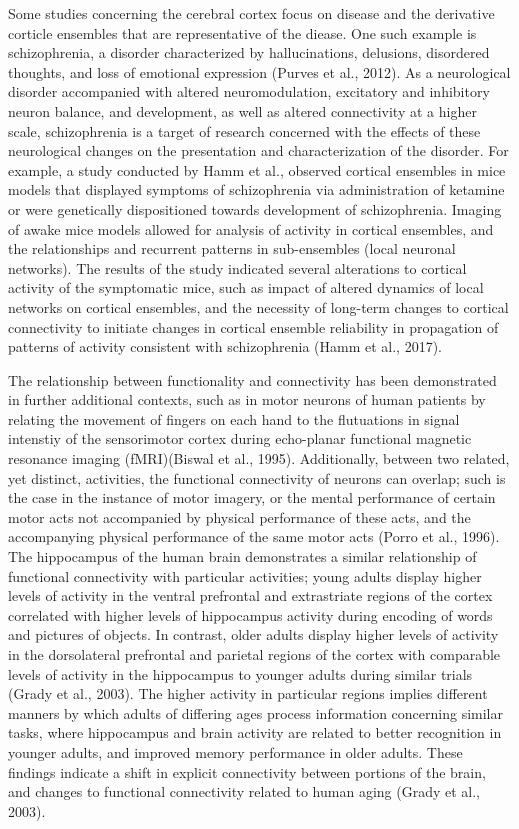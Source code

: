 \documentclass[11pt]{article}
\begin{document}
Some studies concerning the cerebral cortex focus on disease and the derivative corticle ensembles that are representative of the diease. One such example is schizophrenia, a disorder characterized by hallucinations, delusions, disordered thoughts, and loss of emotional expression (Purves et al., 2012). As a neurological disorder accompanied with altered neuromodulation, excitatory and inhibitory neuron balance, and development, as well as altered connectivity at a higher scale, schizophrenia is a target of research concerned with the effects of these neurological changes on the presentation and characterization of the disorder. For example, a study conducted by Hamm et al., observed cortical ensembles in mice models that displayed symptoms of schizophrenia via administration of ketamine or were genetically dispositioned towards development of schizophrenia. Imaging of awake mice models allowed for analysis of activity in cortical ensembles, and the relationships and recurrent patterns in sub-ensembles (local neuronal networks). The results of the study indicated several alterations to cortical activity of the symptomatic mice, such as impact of altered dynamics of local networks on cortical ensembles, and the necessity of long-term changes to cortical connectivity to initiate changes in cortical ensemble reliability in propagation of patterns of activity consistent with schizophrenia (Hamm et al., 2017).\par

The relationship between functionality and connectivity has been demonstrated in further additional contexts, such as in motor neurons of human patients by relating the movement of fingers on each hand to the flutuations in signal intenstiy of the sensorimotor cortex during echo-planar functional magnetic resonance imaging (fMRI)(Biswal et al., 1995). Additionally, between two related, yet distinct, activities, the functional connectivity of neurons can overlap; such is the case in the instance of motor imagery, or the mental performance of certain motor acts not accompanied by physical performance of these acts, and the accompanying physical performance of the same motor acts (Porro et al., 1996). The hippocampus of the human brain demonstrates a similar relationship of functional connectivity with particular activities; young adults display higher levels of activity in the ventral prefrontal and extrastriate regions of the cortex correlated with higher levels of hippocampus activity during  encoding of words and pictures of objects. In contrast, older adults display higher levels of activity in the dorsolateral prefrontal and parietal regions of the cortex with comparable levels of activity in the hippocampus to younger adults during similar trials (Grady et al., 2003). The higher activity in particular regions implies different manners by which adults of differing ages process information concerning similar tasks, where hippocampus and brain activity are related to better recognition in younger adults, and improved memory performance in older adults. These findings indicate a shift in explicit connectivity between portions of the brain, and changes to functional connectivity related to human aging (Grady et al., 2003).\par
\end{document}
